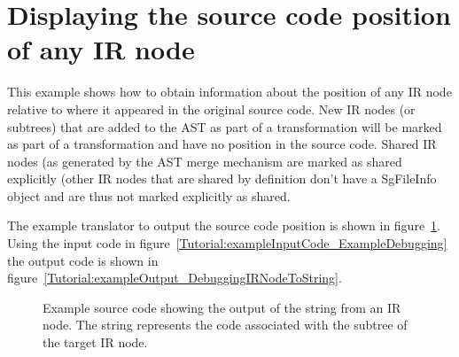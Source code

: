 \section{Displaying the source code position of any IR node}

   This example shows how to obtain information about the position of
any IR node relative to where it appeared in the original source code.
New IR nodes (or subtrees) that are added to the AST as part of a
transformation will be marked as part of a transformation and have
no position in the source code.  Shared IR nodes (as generated by the AST
merge mechanism are marked as shared explicitly (other IR nodes that
are shared by definition don't have a SgFileInfo object and are thus
not marked explicitly as shared.

   The example translator to output the source code position is shown in 
figure~\ref{Tutorial:exampleDebuggingSourceCodePositionInformation}.
Using the input code in 
figure~\ref{Tutorial:exampleInputCode_ExampleDebugging}
the output code is shown in 
figure~\ref{Tutorial:exampleOutput_DebuggingIRNodeToString}.


\begin{figure}[!h]
{\indent
{\mySmallFontSize

\begin{latexonly}
   
\end{latexonly}

\begin{htmlonly}
   
\end{htmlonly}

}
}
\caption{Example source code showing the output of the string from an IR node. The string
         represents the code associated with the subtree of the target IR node.}
\label{Tutorial:exampleDebuggingSourceCodePositionInformation}
\end{figure}




